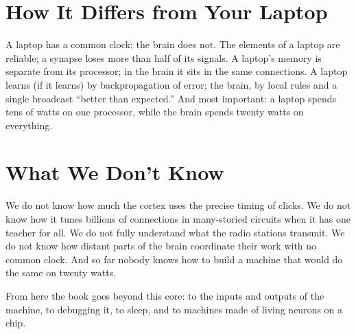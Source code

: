 \section*{How It Differs from Your Laptop}

A laptop has a common clock; the brain does not. The elements of a laptop are reliable; a synapse loses more than half of its signals. A laptop's memory is separate from its processor; in the brain it sits in the same connections. A laptop learns (if it learns) by backpropagation of error; the brain, by local rules and a single broadcast ``better than expected.'' And most important: a laptop spends tens of watts on one processor, while the brain spends twenty watts on everything.

\section*{What We Don't Know}

We do not know how much the cortex uses the precise timing of clicks. We do not know how it tunes billions of connections in many-storied circuits when it has one teacher for all. We do not fully understand what the radio stations transmit. We do not know how distant parts of the brain coordinate their work with no common clock. And so far nobody knows how to build a machine that would do the same on twenty watts.

From here the book goes beyond this core: to the inputs and outputs of the machine, to debugging it, to sleep, and to machines made of living neurons on a chip.


